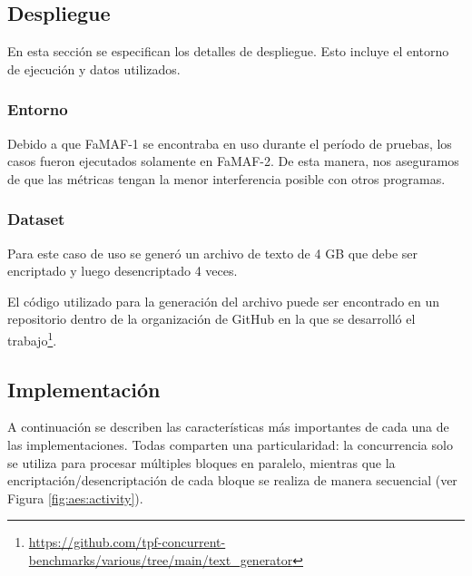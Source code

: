 \documentclass[11pt]{article}
\let\Oldsubsection\subsection
\renewcommand{\subsection}{\FloatBarrier\Oldsubsection}
\let\Oldsubsubsection\subsubsection
\renewcommand{\subsubsection}{\FloatBarrier\Oldsubsubsection}
\begin{document}
\subsection{Despliegue}

En esta sección se especifican los detalles de despliegue. Esto incluye el entorno de ejecución y datos utilizados.

\subsubsection{Entorno}

Debido a que FaMAF-1 se encontraba en uso durante el período de pruebas, los casos fueron ejecutados solamente en FaMAF-2. De esta manera, nos aseguramos de que las métricas tengan la menor interferencia posible con otros programas.

\subsubsection{Dataset}

Para este caso de uso se generó un archivo de texto de 4 GB que debe ser encriptado y luego desencriptado 4 veces.

El código utilizado para la generación del archivo puede ser encontrado en un repositorio dentro de la organización de GitHub en la que se desarrolló el trabajo\footnote{\url{https://github.com/tpf-concurrent-benchmarks/various/tree/main/text_generator}}.

\subsection{Implementación}

A continuación se describen las características más importantes de cada una de las implementaciones. Todas comparten una particularidad: la concurrencia solo se utiliza para procesar múltiples bloques en paralelo, mientras que la encriptación/desencriptación de cada bloque se realiza de manera secuencial (ver Figura \ref{fig:aes:activity}).
\end{document}
